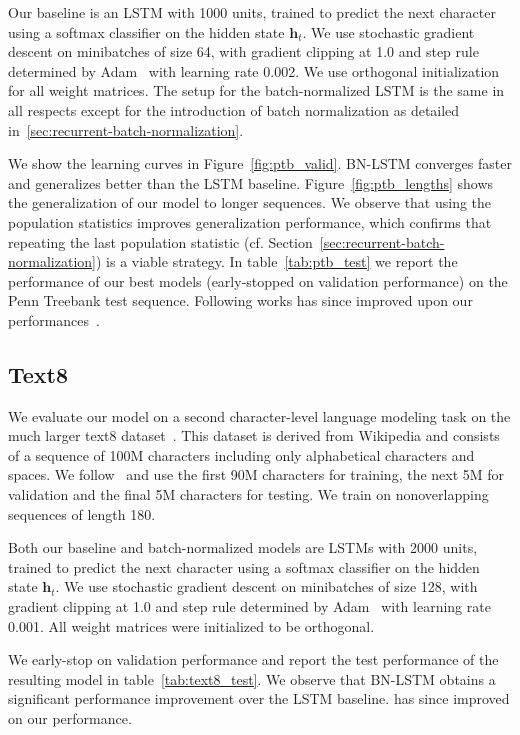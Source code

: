 \documentclass{article} %
\newcommand{\vect}[1]{\mathbf{#1}}
\begin{document}
Our baseline is an LSTM with 1000 units, trained to predict the next character using a softmax classifier on the hidden state $\vect{h}_t$.
We use stochastic gradient descent on minibatches of size 64,
with gradient clipping at 1.0 and step rule determined by Adam~\citep{kingma2014adam}
with learning rate 0.002.
We use orthogonal initialization for all weight matrices.
The setup for the batch-normalized LSTM is the same in all respects except for the introduction of batch normalization as detailed in~\ref{sec:recurrent-batch-normalization}.

We show the learning curves in Figure~\ref{fig:ptb_valid}.
BN-LSTM converges faster and generalizes better than the LSTM baseline.
Figure~\ref{fig:ptb_lengths} shows the generalization of our model to longer sequences.
We observe that using the population statistics improves generalization performance,
which confirms that repeating the last population statistic (cf. Section~\ref{sec:recurrent-batch-normalization})
is a viable strategy.
In table~\ref{tab:ptb_test} we report the performance of our best models (early-stopped on validation performance)
on the Penn Treebank test sequence. %
Following works has since improved upon our performances~\citep{krueger2016zoneout,chung2016hierarchical,ha2016hypernetworks}.

\subsection{Text8}

We evaluate our model on a second character-level language modeling task on the much larger text8 dataset~\citep{mahoney2009large}.
This dataset is derived from Wikipedia and consists of a sequence of 100M characters including only alphabetical characters and spaces.
We follow~\citet{mikolov2012subword,zhang2016architectural} and use the first 90M characters for training, the next 5M for validation and the final 5M characters for testing.
We train on nonoverlapping sequences of length 180.

Both our baseline and batch-normalized models are LSTMs with 2000 units, trained to predict the next character using a softmax classifier
on the hidden state $\vect{h}_t$. We use stochastic gradient descent on minibatches of size 128,
with gradient clipping at 1.0 and step rule determined by Adam~\citep{kingma2014adam}
with learning rate 0.001.
All weight matrices were initialized to be orthogonal.

We early-stop on validation performance and report the test performance of the resulting model in table~\ref{tab:text8_test}.
We observe that BN-LSTM obtains a significant performance improvement over the LSTM baseline.
\citep{chung2016hierarchical} has since improved on our performance.
\end{document}
